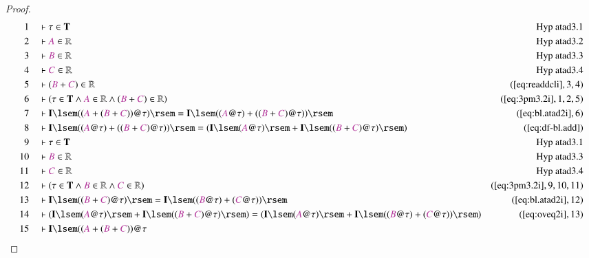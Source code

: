 \begin{proof}
\begin{align}
  1 &&  & \vdash \tau \in \mathbf{T}&\text{Hyp~atad3.1}\notag%
  \\ 2 &&  & \vdash \mc{A} \in \mathbb{R}&\text{Hyp~atad3.2}\notag%
  \\ 3 &&  & \vdash \mc{B} \in \mathbb{R}&\text{Hyp~atad3.3}\notag%
  \\ 4 &&  & \vdash \mc{C} \in \mathbb{R}&\text{Hyp~atad3.4}\notag%
  \\ 5 &&  & \vdash ( \mc{B} + \mc{C} ) \in
      \mathbb{R}&(\mbox{\ref{eq:readdcli}},3,4)\notag
  \\ 6 &&  & \vdash ( \tau \in \mathbf{T} \wedge \mc{A} \in \mathbb{R} \wedge (
      \mc{B} + \mc{C} ) \in \mathbb{R}
      )&(\mbox{\ref{eq:3pm3.2i}},1,2,5)\notag
  \\ 7 &&  & \vdash \mathbf{I} \lsem ( ( \mc{A} + ( \mc{B} + \mc{C} ) ) @ \tau
      ) \rsem = \mathbf{I} \lsem ( ( \mc{A} @ \tau ) + ( (
      \mc{B} + \mc{C} ) @ \tau ) )
      \rsem&(\mbox{\ref{eq:bl.atad2i}},6)\notag
  \\ 8 &&  & \vdash \mathbf{I} \lsem ( ( \mc{A} @ \tau ) + ( ( \mc{B} + \mc{C}
      ) @ \tau ) ) \rsem = ( \mathbf{I} \lsem ( \mc{A} @
      \tau ) \rsem + \mathbf{I} \lsem ( ( \mc{B} + \mc{C} )
      @ \tau ) \rsem )&(\mbox{\ref{eq:df-bl.add}})\notag
  \\ 9 &&  & \vdash \tau \in \mathbf{T}&\text{Hyp~atad3.1}\notag%
  \\ 10 &&  & \vdash \mc{B} \in \mathbb{R}&\text{Hyp~atad3.3}\notag%
  \\ 11 &&  & \vdash \mc{C} \in \mathbb{R}&\text{Hyp~atad3.4}\notag%
  \\ 12 &&  & \vdash ( \tau \in \mathbf{T} \wedge \mc{B} \in \mathbb{R} \wedge
      \mc{C} \in \mathbb{R}
      )&(\mbox{\ref{eq:3pm3.2i}},9,10,11)\notag
  \\ 13 &&  & \vdash \mathbf{I} \lsem ( ( \mc{B} + \mc{C} ) @ \tau ) \rsem =
      \mathbf{I} \lsem ( ( \mc{B} @ \tau ) + ( \mc{C} @
      \tau ) ) \rsem&(\mbox{\ref{eq:bl.atad2i}},12)\notag
  \\ 14 &&  & \vdash ( \mathbf{I} \lsem ( \mc{A} @ \tau ) \rsem + \mathbf{I}
      \lsem ( ( \mc{B} + \mc{C} ) @ \tau ) \rsem ) = (
      \mathbf{I} \lsem ( \mc{A} @ \tau ) \rsem + \mathbf{I}
      \lsem ( ( \mc{B} @ \tau ) + ( \mc{C} @ \tau ) ) \rsem
      )&(\mbox{\ref{eq:oveq2i}},13)\notag
  \\ 15 &&  & \vdash \mathbf{I} \lsem ( ( \mc{A} + ( \mc{B} + \mc{C} ) ) @ \tau

\end{align}
\end{proof}
